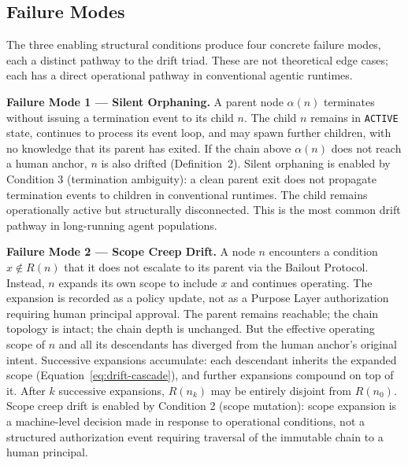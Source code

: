 \subsection{Failure Modes}
\label{sec:drift-failure-modes}

The three enabling structural conditions produce four concrete failure modes, each a distinct pathway to the drift triad. These are not theoretical edge cases; each has a direct operational pathway in conventional agentic runtimes.

\medskip
\noindent\textbf{Failure Mode 1 — Silent Orphaning.}
A parent node $\alpha(n)$ terminates without issuing a termination event to its child $n$. The child $n$ remains in \texttt{ACTIVE} state, continues to process its event loop, and may spawn further children, with no knowledge that its parent has exited. If the chain above $\alpha(n)$ does not reach a human anchor, $n$ is also drifted (Definition~2). Silent orphaning is enabled by Condition 3 (termination ambiguity): a clean parent exit does not propagate termination events to children in conventional runtimes. The child remains operationally active but structurally disconnected. This is the most common drift pathway in long-running agent populations.

\medskip
\noindent\textbf{Failure Mode 2 — Scope Creep Drift.}
A node $n$ encounters a condition $x \notin R(n)$ that it does not escalate to its parent via the Bailout Protocol. Instead, $n$ expands its own scope to include $x$ and continues operating. The expansion is recorded as a policy update, not as a Purpose Layer authorization requiring human principal approval. The parent remains reachable; the chain topology is intact; the chain depth is unchanged. But the effective operating scope of $n$ and all its descendants has diverged from the human anchor's original intent. Successive expansions accumulate: each descendant inherits the expanded scope (Equation~\ref{eq:drift-cascade}), and further expansions compound on top of it. After $k$ successive expansions, $R(n_k)$ may be entirely disjoint from $R(n_0)$. Scope creep drift is enabled by Condition 2 (scope mutation): scope expansion is a machine-level decision made in response to operational conditions, not a structured authorization event requiring traversal of the immutable chain to a human principal.

